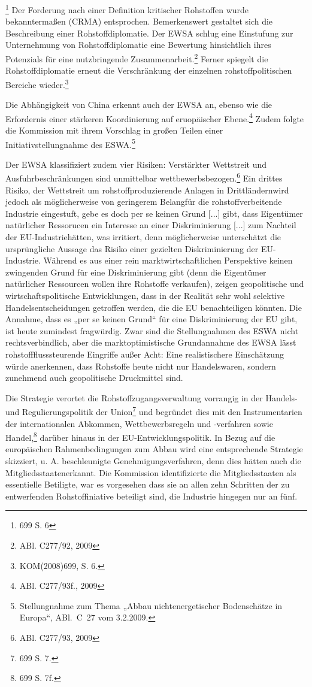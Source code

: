 \documentclass[12pt,a4paper,oneside]{book} %
\begin{document}
\footnote{699 S. 6}
Der Forderung nach einer Definition kritischer Rohstoffen wurde bekanntermaßen (CRMA) entsprochen. Bemerkenswert gestaltet sich die Beschreibung einer \glqq Rohstoffdiplomatie\grqq. Der EWSA schlug eine Einstufung zur Unternehmung von Rohstoffdiplomatie eine Bewertung hinsichtlich ihres Potenzials für \glqq eine nutzbringende Zusammenarbeit\glqq.\footnote{ABl. C277/92, 2009} Ferner spiegelt die Rohstoffdiplomatie erneut die Verschränkung der einzelnen rohstoffpolitischen Bereiche wieder.\footnote{KOM(2008)699, S. 6.} 

 Die Abhängigkeit von China erkennt auch der EWSA an, ebenso wie die Erfordernis einer stärkeren Koordinierung auf eruopäischer Ebene.\footnote{ABl. C277/93f., 2009} Zudem folgte die Kommission mit ihrem Vorschlag in großen Teilen einer Initiativstellungnahme des ESWA.\footnote{Stellungnahme zum Thema „Abbau nichtenergetischer Bodenschätze in Europa“, ABl. C 27 vom 3.2.2009.}

Der EWSA klassifiziert zudem vier Risiken: Verstärkter Wettstreit und Ausfuhrbeschränkungen sind unmittelbar wettbewerbsbezogen.\footnote{ABl. C277/93, 2009} Ein drittes Risiko, der \glqq Wettstreit um rohstoffproduzierende Anlagen in Drittländern\grqq wird jedoch als \glqq möglicherweise von geringerem Belang\grqq für die rohstoffverbeitende Industrie eingestuft, gebe es doch \glqq per se keinen Grund [...] gibt, dass Eigentümer natürlicher Ressorucen ein Interesse an einer Diskriminierung [...] zum Nachteil der EU-Industrie\grqq hätten, was irritiert, denn möglicherweise unterschätzt die ursprüngliche Aussage das Risiko einer gezielten Diskriminierung der EU-Industrie. Während es aus einer rein marktwirtschaftlichen Perspektive keinen zwingenden Grund für eine Diskriminierung gibt (denn die Eigentümer natürlicher Ressourcen wollen ihre Rohstoffe verkaufen), zeigen geopolitische und wirtschaftspolitische Entwicklungen, dass in der Realität sehr wohl selektive Handelsentscheidungen getroffen werden, die die EU benachteiligen könnten. Die Annahme, dass es „per se keinen Grund“ für eine Diskriminierung der EU gibt, ist heute zumindest fragwürdig. Zwar sind die Stellungnahmen des ESWA nicht rechtsverbindlich, aber die marktoptimistische Grundannahme des EWSA lässt rohstoffflusssteurende Eingriffe außer Acht:  Eine realistischere Einschätzung würde anerkennen, dass Rohstoffe heute nicht nur Handelswaren, sondern zunehmend auch geopolitische Druckmittel sind.


Die Strategie verortet die Rohstoffzugangsverwaltung vorrangig in der Handels- und Regulierungspolitik der Union\footnote{699 S. 7.} und begründet dies mit den Instrumentarien der internationalen Abkommen, Wettbewerbsregeln und -verfahren sowie Handel,\footnote{699 S. 7f.} darüber hinaus in der EU-Entwicklungspolitik. In Bezug auf die europäischen Rahmenbedingungen zum Abbau wird eine entsprechende Strategie skizziert, u. A. beschleunigte Genehmigungsverfahren, denn dies hätten \glqq auch die Mitgliedsstaaten\grqq erkannt. Die Kommission identifizierte die Mitgliedsstaaten als essentielle Betiligte, war es vorgesehen dass sie an allen zehn Schritten der zu entwerfenden Rohstoffiniative beteiligt sind, die Industrie hingegen nur an fünf.
\end{document}
